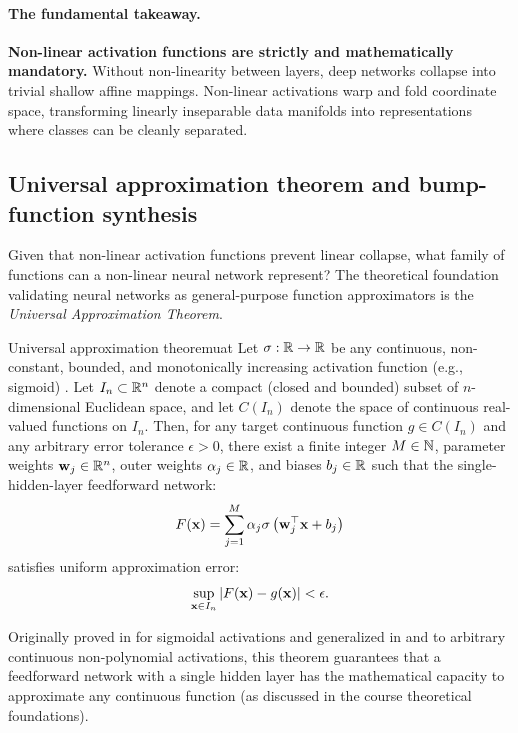 \documentclass[../../main.tex]{subfiles}
\begin{document}
\paragraph{The fundamental takeaway.}
\textbf{Non-linear activation functions are strictly and mathematically mandatory.} Without non-linearity between layers, deep networks collapse into trivial shallow affine mappings. Non-linear activations warp and fold coordinate space, transforming linearly inseparable data manifolds into representations where classes can be cleanly separated.

\subsection{Universal approximation theorem and bump-function synthesis}
\label{subsec:uat_derivation}

Given that non-linear activation functions prevent linear collapse, what family of functions can a non-linear neural network represent? The theoretical foundation validating neural networks as general-purpose function approximators is the \emph{Universal Approximation Theorem}.

\begin{theorem}{Universal approximation theorem}{uat}
Let $\sigma: \mathbb{R} \to \mathbb{R}$ be any continuous, non-constant, bounded, and monotonically increasing activation function (e.g., sigmoid) \cite{cybenko1989}. Let $I_n \subset \mathbb{R}^n$ denote a compact (closed and bounded) subset of $n$-dimensional Euclidean space, and let $C(I_n)$ denote the space of continuous real-valued functions on $I_n$. Then, for any target continuous function $g \in C(I_n)$ and any arbitrary error tolerance $\epsilon > 0$, there exist a finite integer $M \in \mathbb{N}$, parameter weights $\mathbf{w}_j \in \mathbb{R}^n$, outer weights $\alpha_j \in \mathbb{R}$, and biases $b_j \in \mathbb{R}$ such that the single-hidden-layer feedforward network:
\begin{equation}
\label{eq:uat_form}
F(\mathbf{x}) = \sum_{j=1}^M \alpha_j \sigma\left( \mathbf{w}_j^\top \mathbf{x} + b_j \right)
\end{equation}
satisfies uniform approximation error:
\begin{equation}
\label{eq:uat_bound}
\sup_{\mathbf{x} \in I_n} \left| F(\mathbf{x}) - g(\mathbf{x}) \right| < \epsilon.
\end{equation}
\end{theorem}

Originally proved in \cite{cybenko1989} for sigmoidal activations and generalized in \cite{hornik1989} and \cite{leshno1993} to arbitrary continuous non-polynomial activations, this theorem guarantees that a feedforward network with a single hidden layer has the mathematical capacity to approximate any continuous function (as discussed in the course theoretical foundations).
\end{document}
